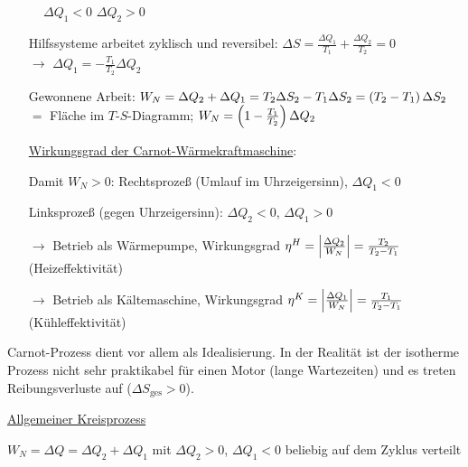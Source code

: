 \begin{figure}[H]
  \centering
  \\
  \\
  $\Delta Q_1 <0$ $\Delta Q_2 > 0$
\end{figure}
\begin{itemize}[align=left]
\item[Hilfssysteme arbeitet zyklisch und reversibel:] $\Delta  S = \frac{\Delta Q_1}{T_1} + \frac{\Delta Q_2}{T_2} = 0$\\ $\rightarrow$ $\Delta Q_1 = - \frac{T_1}{T_2}\Delta Q_2$
\item[Gewonnene Arbeit:] $W_N = \Delta Q_2 + \Delta Q_1 = T_2 \Delta S_2 - T_1 \Delta S_2 = \left( T_2-T_1 \right)\Delta S_2$\\ $=$ Fläche im $T$-$S$-Diagramm; $W_N = \left( 1-\frac{T_1}{T_2} \right)\Delta Q_2$
\item[\uline{Wirkungsgrad der Carnot-Wärmekraftmaschine}:] 
\item[Damit $W_N > 0$:] Rechtsprozeß (Umlauf im Uhrzeigersinn), $\Delta Q_1 < 0$
\item[Linksprozeß (gegen Uhrzeigersinn):] $\Delta Q_2 <0$, $\Delta Q_1 > 0$
\item[$\rightarrow$] Betrieb als Wärmepumpe, Wirkungsgrad $\eta^H = \left| \frac{\Delta Q_2}{W_N} \right| = \frac{T_2}{T_2-T_1}$ (Heizeffektivität)
\item[$\rightarrow$] Betrieb als Kältemaschine, Wirkungsgrad $\eta^K = \left| \frac{\Delta Q_1}{W_N} \right| = \frac{T_1}{T_2-T_1}$ (Kühleffektivität)
\end{itemize}
Carnot-Prozess dient vor allem als Idealisierung. In der Realität ist der isotherme Prozess nicht sehr praktikabel für einen Motor (lange Wartezeiten) und es treten Reibungsverluste auf ($\Delta S_\text{ges} > 0$).

\uline{Allgemeiner Kreisprozess}
\begin{figure}[H]
  \centering
  
\end{figure}

$W_N= \Delta Q = \Delta Q_2 + \Delta Q_1$ mit $\Delta Q_2 > 0$, $\Delta Q_1 < 0$ beliebig auf dem Zyklus verteilt

